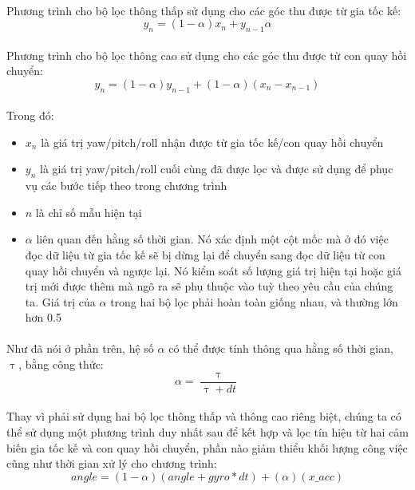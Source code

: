 \paragraph{}Phương trình cho bộ lọc thông thấp sử dụng cho các góc thu được từ gia tốc kế:
\begin{equation}
y_{n} = (1 - \alpha)x_{n} + y_{n-1}\alpha 
\end{equation}
\paragraph{}Phương trình cho bộ lọc thông cao sử dụng cho các góc thu được từ con quay hồi chuyển:
\begin{equation}
y_{n} = (1-\alpha)y_{n-1} + (1-\alpha)(x_{n} - x_{n-1})
\end{equation}
\paragraph{}Trong đó:
\begin{itemize}
	\item  $x_{n}$ là giá trị yaw/pitch/roll nhận được từ gia tốc kế/con quay hồi chuyển
	\item $y_{n}$ là giá trị yaw/pitch/roll cuối cùng đã được lọc và được sử dụng để phục vụ các bước tiếp theo trong chương trình
	\item $n$ là chỉ số mẫu hiện tại
	\item $\alpha$ liên quan đến hằng số thời gian. Nó xác định một cột mốc mà ở đó việc đọc dữ liệu từ gia tốc kế sẽ bị dừng lại để chuyển sang đọc dữ liệu từ con quay hồi chuyển và ngược lại. Nó kiểm soát số lượng giá trị hiện tại hoặc giá trị mới được thêm mà ngõ ra sẽ phụ thuộc vào tuỳ theo yêu cầu của chúng ta. Giá trị của $\alpha$ trong hai bộ lọc phải hoàn toàn giống nhau, và thường lớn hơn 0.5
\end{itemize}
\paragraph{}Như đã nói ở phần trên, hệ số $\alpha$ có thể được tính thông qua hằng số thời gian, $\uptau$, bằng công thức:
\begin{equation*}
	\alpha = \dfrac{\uptau}{\uptau +dt}
\end{equation*}
\paragraph{}Thay vì phải sử dụng hai bộ lọc thông thấp và thông cao riêng biệt, chúng ta có thể sử dụng một phương trình duy nhất sau để kết hợp và lọc tín hiệu từ hai cảm biến gia tốc kế và con quay hồi chuyển, phần nào giảm thiểu khối lượng công việc cũng như thời gian xử lý cho chương trình:
\begin{equation}
angle = (1-\alpha)(angle + gyro * dt) + (\alpha)(x\_acc)
\end{equation}
